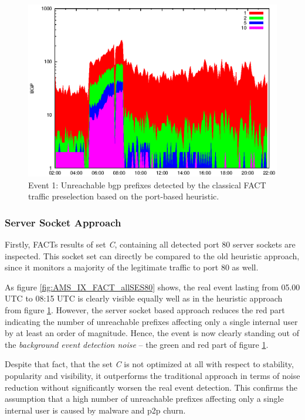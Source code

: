 \begin{figure}
	[p] \centering 
	\includegraphics[width=0.75\linewidth]{images/events/2010_03_25/bgp_log_port80_ref.eps} \caption{Event 1: Unreachable \gls{bgp} prefixes detected by the classical \gls{FACT} traffic preselection based on the port-based heuristic.} 
	\label{fig:AMS_IX_FACT_REF} 
\end{figure}

\subsubsection{Server Socket Approach}

Firstly, \gls{FACT}s results of set \emph{C}, containing all detected port 80 \glspl{server socket} are inspected. 
This socket set can directly be compared to the old heuristic approach, since it monitors a majority of the legitimate traffic to port 80 as well. 

As figure \ref{fig:AMS_IX_FACT_allSES80} shows, the real event lasting from 05.00 UTC to 08:15 UTC is clearly visible equally well as in the heuristic approach from figure \ref{fig:AMS_IX_FACT_REF}.
However, the \gls{server socket} based approach reduces the red part indicating the number of unreachable prefixes affecting only a single internal user by at least an order of magnitude. 
Hence, the event is now clearly standing out of the \emph{background event detection noise} -- the green and red part of figure \ref{fig:AMS_IX_FACT_REF}. 

Despite that fact, that the set \emph{C} is not optimized at all with respect to stability, popularity and visibility, it outperforms the traditional approach in terms of noise reduction without significantly worsen the real event detection. 
This confirms the assumption that a high number of unreachable prefixes affecting only a single internal user is caused by malware and \gls{p2p} churn.

